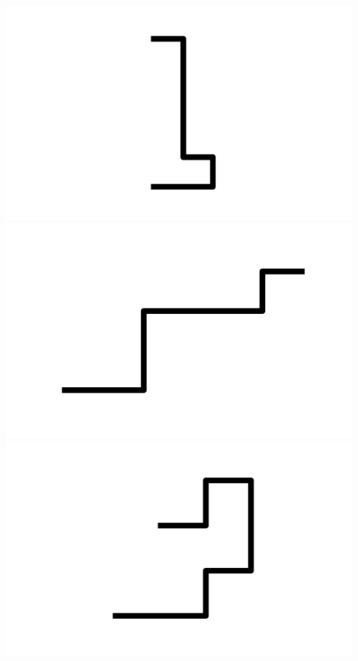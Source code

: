 \documentclass[]{report}
\begin{document}
\includegraphics[scale=.1]{pictures/21/state_cluster_shapes_22.pdf} 
\includegraphics[scale=.1]{pictures/21/state_cluster_shapes_23.pdf} 
\includegraphics[scale=.1]{pictures/21/state_cluster_shapes_24.pdf} 
\end{document}
